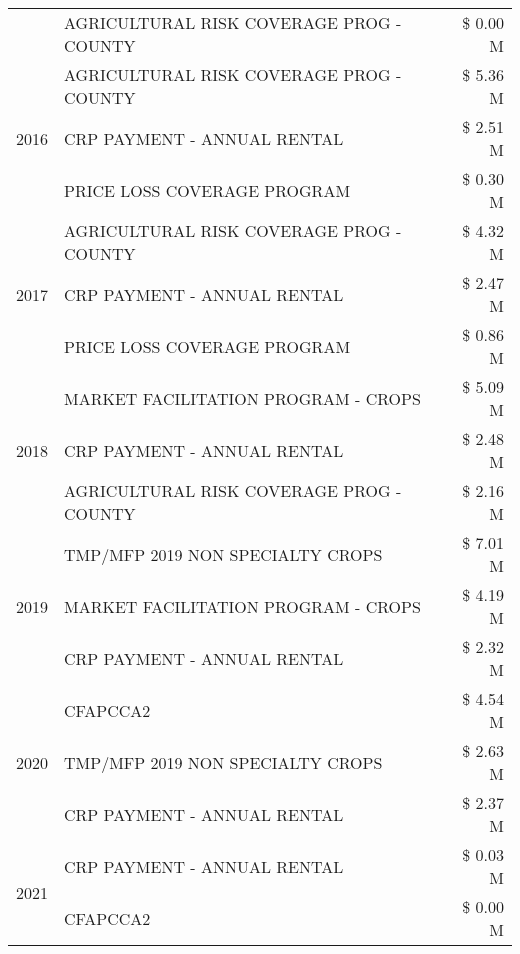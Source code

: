 \begin{tabular}{llr}
 & AGRICULTURAL RISK COVERAGE PROG - COUNTY & \$ 0.00 M \\
\cline{1-3}
\multirow[t]{3}{*}{2016} & AGRICULTURAL RISK COVERAGE PROG - COUNTY      & \$ 5.36 M \\
 & CRP PAYMENT - ANNUAL RENTAL                   & \$ 2.51 M \\
 & PRICE LOSS COVERAGE PROGRAM                   & \$ 0.30 M \\
\cline{1-3}
\multirow[t]{3}{*}{2017} & AGRICULTURAL RISK COVERAGE PROG - COUNTY & \$ 4.32 M \\
 & CRP PAYMENT - ANNUAL RENTAL & \$ 2.47 M \\
 & PRICE LOSS COVERAGE PROGRAM & \$ 0.86 M \\
\cline{1-3}
\multirow[t]{3}{*}{2018} & MARKET FACILITATION PROGRAM - CROPS & \$ 5.09 M \\
 & CRP PAYMENT - ANNUAL RENTAL & \$ 2.48 M \\
 & AGRICULTURAL RISK COVERAGE PROG - COUNTY & \$ 2.16 M \\
\cline{1-3}
\multirow[t]{3}{*}{2019} & TMP/MFP 2019 NON SPECIALTY CROPS & \$ 7.01 M \\
 & MARKET FACILITATION PROGRAM - CROPS & \$ 4.19 M \\
 & CRP PAYMENT - ANNUAL RENTAL & \$ 2.32 M \\
\cline{1-3}
\multirow[t]{3}{*}{2020} & CFAPCCA2 & \$ 4.54 M \\
 & TMP/MFP 2019 NON SPECIALTY CROPS & \$ 2.63 M \\
 & CRP PAYMENT - ANNUAL RENTAL & \$ 2.37 M \\
\cline{1-3}
\multirow[t]{2}{*}{2021} & CRP PAYMENT - ANNUAL RENTAL & \$ 0.03 M \\
 & CFAPCCA2 & \$ 0.00 M \\
\cline{1-3}
\bottomrule
\end{tabular}
